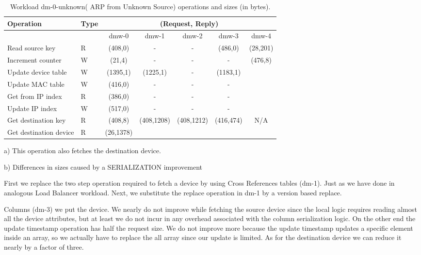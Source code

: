 \documentclass[12pt,openright,twoside]{report}
\begin{document}
\begin{table}[ht]
\small
\centering 
\begin{threeparttable}
\begin{tabular}{ll ccccc}
 Operation & Type &  \multicolumn{5}{c}{ (Request, Reply) } \\  \midrule
&  & dmw-0 & dmw-1  & dmw-2 & dmw-3 & dmw-4 \\ \toprule 
Read source key & R & (408,0) & - & - & (486,0) & (28,201)\tnote{a}\\
Increment counter & W & (21,4) & -  & - & - & \multirow{5}{*}{(476,8)} \\
Update device table & W & (1395,1) & (1225,1)\tnote{b}  & - &
(1183,1) & \\
Update MAC  table & W & (416,0) & - & - & -
& \\
Get from IP index & R & (386,0) & - & - & - & \\
Update IP index  & W & (517,0) & - & - & - & \\
Get destination key & R & (408,8) &
\multirow{2}{*}{(408,1208)}\tnote{b} & \multirow{2}{*}{(408,1212)} &
\multirow{2}{*}{(416,474)} & \multirow{2}{*}{N/A}  \\ 
Get destination device & R & (26,1378)  &  & & \\\bottomrule
\end{tabular}
\caption[Workload dm-0-unknown( ARP from Unknown Source)
operations]{Workload dm-0-unknown( ARP from Unknown Source) operations
  and sizes (in bytes).}
\begin{tablenotes}
\item [a)] This operation also fetches the destination device.
\item [b)] Differences in sizes caused by a SERIALIZATION improvement 
\end{tablenotes}
\end{threeparttable}
\end{table}


First we  replace the two step operation required to fetch a device by
using Cross References tables (dm-1). Just as we have done in
analogous Load Balancer workload.  Next, we substitute the replace
operation in dm-1 by a version based replace. 

Columns (dm-3) we put the device. We  nearly do not improve  while
fetching the source device since the local logic requires reading
almost all the device attributes, but at least we do not incur in any
overhead associated with the column serialization logic. On the other
end the update timestamp operation has half the request size. We do
not improve more because the update timestamp updates a specific
element inside an array, so we actually have to replace the all array
since our update is limited. As for the destination device we can
reduce it nearly by a factor of three. 
\end{document}
